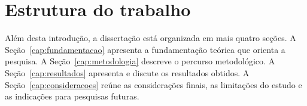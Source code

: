 \section{Estrutura do trabalho}
\label{sec:estrutura}

Além desta introdução, a dissertação está organizada em mais quatro seções. A Seção~\ref{cap:fundamentacao} apresenta a fundamentação teórica que orienta a pesquisa. A Seção~\ref{cap:metodologia} descreve o percurso metodológico. A Seção~\ref{cap:resultados} apresenta e discute os resultados obtidos. A Seção~\ref{cap:consideracoes} reúne as considerações finais, as limitações do estudo e as indicações para pesquisas futuras.
